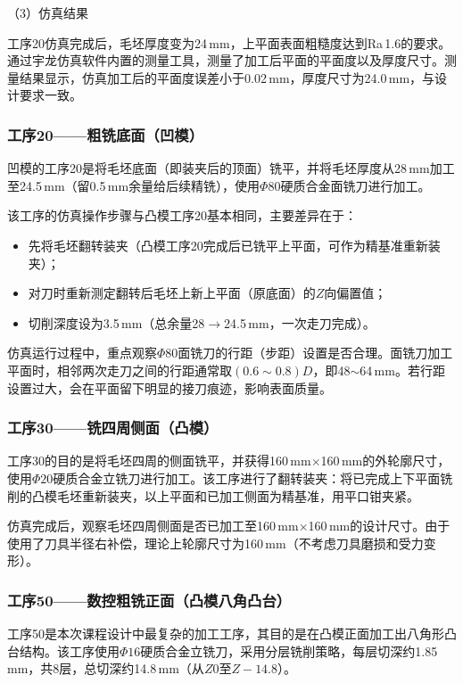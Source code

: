 \documentclass{xautCADreport}
\begin{document}
（3）仿真结果

工序20仿真完成后，毛坯厚度变为24\,mm，上平面表面粗糙度达到Ra\,1.6的要求。通过宇龙仿真软件内置的测量工具，测量了加工后平面的平面度以及厚度尺寸。测量结果显示，仿真加工后的平面度误差小于0.02\,mm，厚度尺寸为24.0\,mm，与设计要求一致。

\subsubsection{工序20——粗铣底面（凹模）}

凹模的工序20是将毛坯底面（即装夹后的顶面）铣平，并将毛坯厚度从28\,mm加工至24.5\,mm（留0.5\,mm余量给后续精铣），使用$\Phi80$硬质合金面铣刀进行加工。

该工序的仿真操作步骤与凸模工序20基本相同，主要差异在于：
\begin{itemize}
  \item 先将毛坯翻转装夹（凸模工序20完成后已铣平上平面，可作为精基准重新装夹）；
  \item 对刀时重新测定翻转后毛坯上新上平面（原底面）的$Z$向偏置值；
  \item 切削深度设为3.5\,mm（总余量28$\rightarrow$24.5\,mm，一次走刀完成）。
\end{itemize}

仿真运行过程中，重点观察$\Phi80$面铣刀的行距（步距）设置是否合理。面铣刀加工平面时，相邻两次走刀之间的行距通常取$(0.6\sim0.8)D$，即48$\sim$64\,mm。若行距设置过大，会在平面留下明显的接刀痕迹，影响表面质量。

\subsubsection{工序30——铣四周侧面（凸模）}

工序30的目的是将毛坯四周的侧面铣平，并获得160\,mm$\times$160\,mm的外轮廓尺寸，使用$\Phi20$硬质合金立铣刀进行加工。该工序进行了翻转装夹：将已完成上下平面铣削的凸模毛坯重新装夹，以上平面和已加工侧面为精基准，用平口钳夹紧。

仿真完成后，观察毛坯四周侧面是否已加工至160\,mm$\times$160\,mm的设计尺寸。由于使用了刀具半径右补偿，理论上轮廓尺寸为160\,mm（不考虑刀具磨损和受力变形）。

\subsubsection{工序50——数控粗铣正面（凸模八角凸台）}

工序50是本次课程设计中最复杂的加工工序，其目的是在凸模正面加工出八角形凸台结构。该工序使用$\Phi16$硬质合金立铣刀，采用分层铣削策略，每层切深约1.85\,mm，共8层，总切深约14.8\,mm（从$Z0$至$Z-14.8$）。
\end{document}
